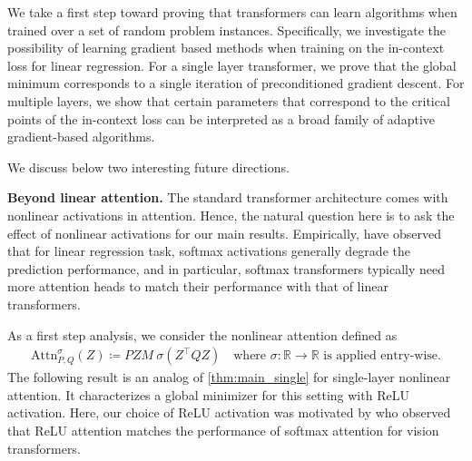 \documentclass{article}
\newcommand{\R}{\mathbb{R}}
\newcommand{\atth}{\mathrm{Attn}^\sigma}
\begin{document}
We take a first step toward proving that transformers can learn algorithms when trained over a set of random problem instances. Specifically, we investigate the possibility of learning gradient based methods when training on the in-context loss for linear regression. 
For a single layer transformer, we prove that the global minimum corresponds to a single iteration of preconditioned gradient descent.  
For multiple layers, we show that certain parameters that correspond to the critical points of the in-context loss can be interpreted as a broad family of adaptive gradient-based algorithms.

 
We discuss below two interesting future directions.

\textbf{Beyond linear attention.} The standard transformer architecture comes with nonlinear activations in attention. Hence, the natural question here is to ask the effect of nonlinear activations for our main results. Empirically, \cite{von2022transformers} have observed that for linear regression task, softmax activations  generally degrade the prediction performance, and in particular, softmax transformers typically need more attention heads to match their performance with that of linear transformers. 

As a first step analysis, we consider the nonlinear attention defined as 
\begin{align}
    \atth_{P,Q}(Z) \coloneqq  P ZM \  \sigma (Z^\top Q Z)\quad \text{where }\sigma :\R\to \R \text{ is applied entry-wise.}
\end{align}  
The following result is an analog of \autoref{thm:main_single} for single-layer nonlinear attention. It characterizes a global minimizer for this setting with ReLU activation.
Here, our choice of ReLU activation was motivated by \cite{wortsman2023replacing} who observed that ReLU attention matches the performance of softmax attention for vision transformers. 
\end{document}
